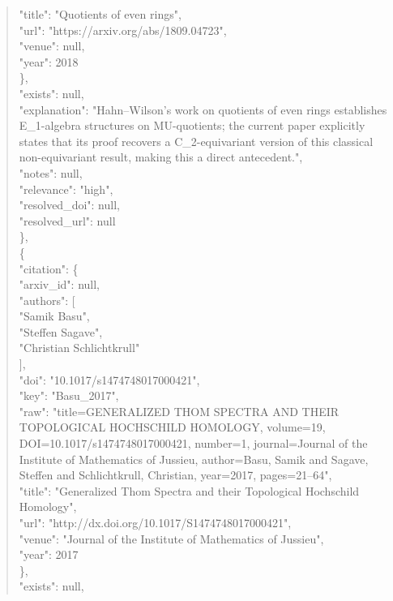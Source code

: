 \documentclass[11pt]{article}
\begin{document}
\begin{quote}
        "title": "Quotients of even rings",\\
        "url": "https://arxiv.org/abs/1809.04723",\\
        "venue": null,\\
        "year": 2018\\
      \},\\
      "exists": null,\\
      "explanation": "Hahn--Wilson's work on quotients of even rings establishes E\_1-algebra structures on MU-quotients; the current paper explicitly states that its proof recovers a C\_2-equivariant version of this classical non-equivariant result, making this a direct antecedent.",\\
      "notes": null,\\
      "relevance": "high",\\
      "resolved\_doi": null,\\
      "resolved\_url": null\\
    \},\\
    \{\\
      "citation": \{\\
        "arxiv\_id": null,\\
        "authors": [\\
          "Samik Basu",\\
          "Steffen Sagave",\\
          "Christian Schlichtkrull"\\
        ],\\
        "doi": "10.1017/s1474748017000421",\\
        "key": "Basu\_2017",\\
        "raw": "title=GENERALIZED THOM SPECTRA AND THEIR TOPOLOGICAL HOCHSCHILD HOMOLOGY, volume=19, DOI=10.1017/s1474748017000421, number=1, journal=Journal of the Institute of Mathematics of Jussieu, author=Basu, Samik and Sagave, Steffen and Schlichtkrull, Christian, year=2017, pages=21--64",\\
        "title": "Generalized Thom Spectra and their Topological Hochschild Homology",\\
        "url": "http://dx.doi.org/10.1017/S1474748017000421",\\
        "venue": "Journal of the Institute of Mathematics of Jussieu",\\
        "year": 2017\\
      \},\\
      "exists": null,\\

\end{quote}
\end{document}
